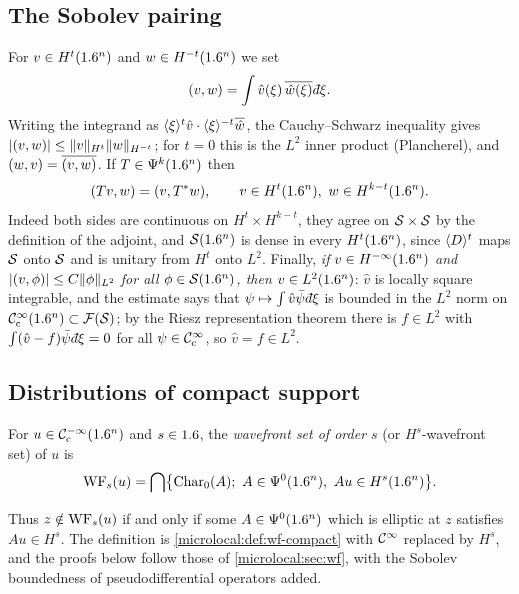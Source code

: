 \subsection*{The Sobolev pairing}
For $v\in H^t(1.6^n)$ and $w\in H^{-t}(1.6^n)$ we set
\begin{equation*}
  \inner vw=\int\hat v(\xi)\,\overline{\hat w(\xi)}\,\dbar\xi .
\end{equation*}
Writing the integrand as $\langle \xi\rangle^t\hat v\cdot\langle \xi\rangle^{-t}\overline{\hat w}$,
the Cauchy--Schwarz inequality gives
$\lvert ( v, w)\rvert\le\lVert v\rVert_{H^t}\lVert w\rVert_{H^{-t}}$; for $t=0$ this is the
$L^2$ inner product (Plancherel), and $( w, v)=\overline{( v, w)}$. If
$T\in\Psi^{k}(1.6^n)$ then
\begin{equation}\label{microlocal:eq:sobolev-adjoint}
  ( Tv, w)=( v, T^*w),\qquad v\in H^t(1.6^n),\ w\in H^{k-t}(1.6^n).
\end{equation}
Indeed both sides are continuous on $H^t\times H^{k-t}$, they agree on
$\mathcal{S}\times\mathcal{S}$ by the definition of the adjoint, and $\mathcal{S}(1.6^n)$ is dense in
every $H^t(1.6^n)$, since $\langle D\rangle^t$ maps $\mathcal{S}$ onto $\mathcal{S}$ and is unitary from
$H^t$ onto $L^2$. Finally, \emph{if $v\in H^{-\infty}(1.6^n)$ and
$\lvert ( v, \phi)\rvert\le C\lVert \phi\rVert_{L^2}$ for all $\phi\in\mathcal{S}(1.6^n)$, then
$v\in L^2(1.6^n)$}: $\hat v$ is locally square integrable, and the estimate says
that $\psi\mapsto\int\hat v\bar\psi\,\dbar\xi$ is bounded in the $L^2$ norm on
$\mathcal{C}^\infty_{\mathrm{c}}(1.6^n)\subset\mathcal{F}(\mathcal{S})$; by the Riesz representation theorem there is
$f\in L^2$ with $\int(\hat v-f)\bar\psi\,\dbar\xi=0$ for all $\psi\in\mathcal{C}^\infty_{\mathrm{c}}$, so
$\hat v=f\in L^2$.

\subsection{Distributions of compact support}

\begin{definition}\label{microlocal:def:wf-s-compact}
  For $u\in\mathcal{C}^{-\infty}_{\mathrm{c}}(1.6^n)$ and $s\in1.6$, the \emph{wavefront set of order $s$} (or
  $H^s$-wavefront set) of $u$ is
  \begin{equation*}
    \WF_s(u)=\bigcap\bigl\{\Char_0(A);\ A\in\Psido0(\R^n),\ Au\in H^s(\R^n)\bigr\}.
  \end{equation*}
\end{definition}

Thus $z\notin\operatorname{WF}_s(u)$ if and only if some $A\in\Psi^{0}(1.6^n)$ which is
elliptic at $z$ satisfies $Au\in H^s$. The definition is
\cref{microlocal:def:wf-compact} with $\mathcal{C}^\infty$ replaced by $H^s$, and the proofs below follow those
of \cref{microlocal:sec:wf}, with the Sobolev boundedness of
pseudodifferential operators added.

